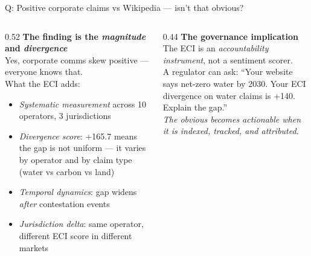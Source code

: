 \documentclass[aspectratio=169,11pt]{beamer}
\begin{document}
\begin{frame}[noframenumbering]{\enspace Q: Positive corporate claims vs Wikipedia — isn't that obvious?}
\begin{columns}[T]
\begin{column}{0.52\textwidth}
  \small\textbf{The finding is the \textit{magnitude} and \textit{divergence}}\\[0.4em]
  \footnotesize
  Yes, corporate comms skew positive — everyone knows that.\\[0.3em]
  What the ECI adds:
  \begin{itemize}
    \item \textit{Systematic measurement} across 10 operators, 3 jurisdictions
    \item \textit{Divergence score}: +165.7 means the gap is not uniform — it varies by operator and by claim type (water vs carbon vs land)
    \item \textit{Temporal dynamics}: gap widens \textit{after} contestation events
    \item \textit{Jurisdiction delta}: same operator, different ECI score in different markets
  \end{itemize}
\end{column}
\begin{column}{0.44\textwidth}
  \small\textbf{The governance implication}\\[0.4em]
  \footnotesize
  The ECI is an \textit{accountability instrument}, not a sentiment scorer.\\[0.3em]
  A regulator can ask: ``Your website says net-zero water by 2030. Your ECI divergence on water claims is +140. Explain the gap.''\\[0.4em]
  \textcolor{dcgray}{\textit{The obvious becomes actionable when it is indexed, tracked, and attributed.}}
\end{column}
\end{columns}
\end{frame}
\end{document}
